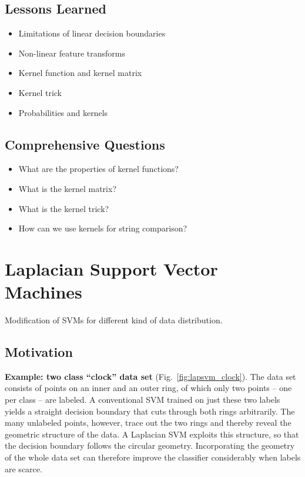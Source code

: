 \subsection{Lessons Learned}

	\begin{itemize}
		\item Limitations of linear decision boundaries 
		\item Non-linear feature transforms
		\item Kernel function and kernel matrix 
		\item Kernel trick 
		\item Probabilities and kernels
	\end{itemize}
  
\subsection{Comprehensive Questions}
	\begin{itemize}
		\item What are the properties of kernel functions? 
		\item What is the kernel matrix?  
		\item What is the kernel trick?  
		\item How can we use kernels for string comparison?
	\end{itemize}
 
 \newpage 
\section{Laplacian Support Vector Machines}\autocite{belkin2006,melacci2011}

Modification of SVMs for different kind of data distribution. 

\subsection{Motivation}
  \textbf{Example: two class ``clock'' data set} (Fig.~\ref{fig:lapsvm_clock}).
  The data set consists of points on an inner and an outer ring, of which only two points -- one per class -- are labeled. A conventional SVM trained on just these two labels yields a straight decision boundary that cuts through both rings arbitrarily. The many unlabeled points, however, trace out the two rings and thereby reveal the geometric structure of the data. A Laplacian SVM exploits this structure, so that the decision boundary follows the circular geometry. Incorporating the geometry of the whole data set can therefore improve the classifier considerably when labels are scarce.

